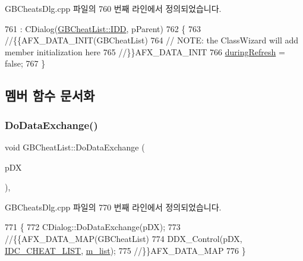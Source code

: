 G\+B\+Cheats\+Dlg.\+cpp 파일의 760 번째 라인에서 정의되었습니다.


\begin{DoxyCode}
761   : CDialog(\mbox{\hyperlink{class_g_b_cheat_list_acbd6ac83ab43510a2dcbab793ecb5fb8a984652944599dcf7e60131db4088f5a0}{GBCheatList::IDD}}, pParent)
762 \{
763   \textcolor{comment}{//\{\{AFX\_DATA\_INIT(GBCheatList)}
764   \textcolor{comment}{// NOTE: the ClassWizard will add member initialization here}
765   \textcolor{comment}{//\}\}AFX\_DATA\_INIT}
766   \mbox{\hyperlink{class_g_b_cheat_list_aba5dc0a50355411fd9c82f87fbdbeb2e}{duringRefresh}} = \textcolor{keyword}{false};
767 \}
\end{DoxyCode}


\subsection{멤버 함수 문서화}
\mbox{\label{class_g_b_cheat_list_ab521fa9ea4378fa0d15b4f61a6e7f965}} 
\subsubsection{\texorpdfstring{Do\+Data\+Exchange()}{DoDataExchange()}}
{\footnotesize\ttfamily void G\+B\+Cheat\+List\+::\+Do\+Data\+Exchange (\begin{DoxyParamCaption}\item[{C\+Data\+Exchange $\ast$}]{p\+DX }\end{DoxyParamCaption})\hspace{0.3cm}{\ttfamily [protected]}, {\ttfamily [virtual]}}



G\+B\+Cheats\+Dlg.\+cpp 파일의 770 번째 라인에서 정의되었습니다.


\begin{DoxyCode}
771 \{
772   CDialog::DoDataExchange(pDX);
773   \textcolor{comment}{//\{\{AFX\_DATA\_MAP(GBCheatList)}
774   DDX\_Control(pDX, \mbox{\hyperlink{resource_8h_a9e21f8b69374571cc4aa6ab5a8ce0b9b}{IDC\_CHEAT\_LIST}}, \mbox{\hyperlink{class_g_b_cheat_list_aca0eaf2ff30100f5d11e4c80193ad90e}{m\_list}});
775   \textcolor{comment}{//\}\}AFX\_DATA\_MAP}
776 \}
\end{DoxyCode}
\mbox{\label{class_g_b_cheat_list_a9bb70cfb03b60aae7f599000144df75e}} 
